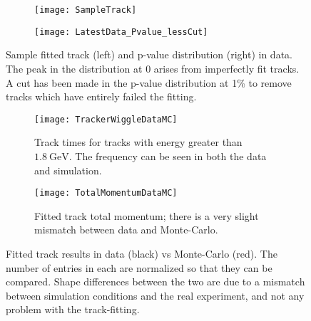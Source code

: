     \begin{figure}
    \centering
        \begin{subfigure}[t]{0.54\textwidth}
            \centering
            \texttt{[image: SampleTrack]}
        \end{subfigure}
        \hspace{0mm}
        \begin{subfigure}[t]{0.44\textwidth}
            \centering
            \texttt{[image: LatestData\_Pvalue\_lessCut]}
        \end{subfigure}
    \caption[Sample fitted track and p-value distribution for fitted tracks in data]{Sample fitted track (left) and p-value distribution (right) in data. The peak in the distribution at 0 arises from imperfectly fit tracks. A cut has been made in the p-value distribution at 1\% to remove tracks which have entirely failed the fitting.}
    \label{fig:SampleTrackPValue}
    \end{figure}



    \begin{figure}
    \centering
        \begin{subfigure}[t]{0.47\textwidth}
            \centering
            \texttt{[image: TrackerWiggleDataMC]}
            \caption{Track times for tracks with energy greater than $\SI{1.8}{\GeV}$. The \wa frequency can be seen in both the data and simulation.}
        \end{subfigure}
        \hspace{5mm}
        \begin{subfigure}[t]{0.47\textwidth}
            \centering
            \texttt{[image: TotalMomentumDataMC]}
            \caption{Fitted track total momentum; there is a very slight mismatch between data and Monte-Carlo.}
        \end{subfigure}
    \caption[Fitted tracks in data compared to Monte-Carlo, track times and total momentum]{Fitted track results in data (black) vs Monte-Carlo (red). The number of entries in each are normalized so that they can be compared. Shape differences between the two are due to a mismatch between simulation conditions and the real experiment, and not any problem with the track-fitting.}
    \label{fig:TracksDataMCFirst}
    \end{figure}


